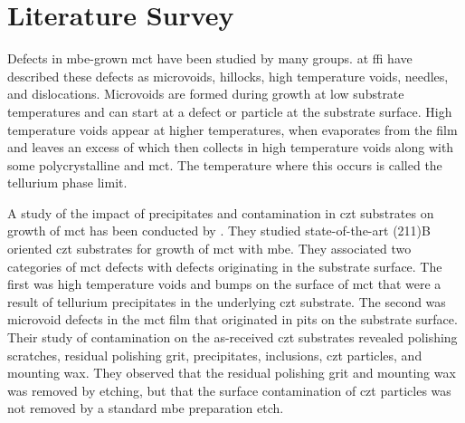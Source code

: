 \section{Literature Survey}%
%
%
%
%
%
Defects in \ac{mbe}-grown \ac{mct} have been studied by many groups. \citet{selvig2007defects, selvig2008defects-a, selvig2008defects-b} at \ac{ffi} have described these defects as microvoids, hillocks, high temperature voids, needles, and dislocations. Microvoids are formed during growth at low substrate temperatures and can start at a defect or particle at the substrate surface. High temperature voids appear at higher temperatures, when  evaporates from the film and leaves an excess of  which then collects in high temperature voids along with some polycrystalline  and \ac{mct}. The temperature where this occurs is called the tellurium phase limit.

A study of the impact of precipitates and contamination in \ac{czt} substrates on growth of \ac{mct} has been conducted by \citet{benson2014impact, benson2015as-received, benson2016analysis}. They studied state-of-the-art (211)B oriented \ac{czt} substrates for growth of \ac{mct} with \ac{mbe}. They associated two categories of \ac{mct} defects with defects originating in the substrate surface. The first was high temperature voids and bumps on the surface of \ac{mct} that were a result of tellurium precipitates in the underlying \ac{czt} substrate. The second was microvoid defects in the \ac{mct} film that originated in pits on the substrate surface. Their study of contamination on the as-received \ac{czt} substrates revealed polishing scratches,  residual polishing grit,  precipitates,  inclusions, \ac{czt} particles, and mounting wax. They observed that the residual polishing grit and mounting wax was removed by etching, but that the surface contamination of \ac{czt} particles was not removed by a standard \ac{mbe} preparation etch. %

